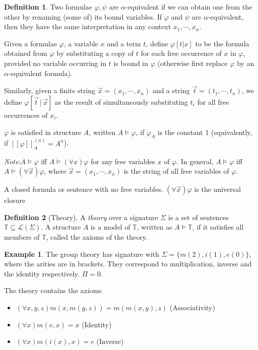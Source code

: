 \documentclass[a4paper]{article}
\theoremstyle{definition}
\newtheorem*{defi}{Definition}
\newtheorem*{eg}{Example}
\newcommand{\note}{\noindent \emph{Note}:\;}
\newcommand{\T}{\mathbb{T}}
\newcommand{\La}{\mathcal{L}}
\begin{document}
\begin{defi}
  Two formulae $\varphi, \psi$ are $\alpha$-equivalent if we can obtain one from the other by renaming (some of) its bound variables. If $\varphi$ and $\psi$ are $\alpha$-equivalent, then they have the same interpretation in any context $x_1, \cdots, x_n$.

  Given a formulae $\varphi$, a variable $x$ and a term $t$, define $\varphi[t|x]$ to be the formula obtained from $\varphi$ by substituting a copy of $t$ for each free occurrence of $x$ in $\varphi$, provided no variable occurring in $t$ is bound in $\varphi$ (otherwise first replace $\varphi$ by an $\alpha$-equivalent formula).

Similarly, given a finite string $\vec x = (x_1, \cdots, x_n)$ and a string $\vec t = (t_1, \cdots, t_n)$, we define $\varphi[\vec t\,|\,\vec x]$ as the result of simultaneously substituting $t_i$ for all free occurrences of $x_i$.

$\varphi$ is satisfied in structure $A$, written $A\models \varphi$, if $\varphi_A$ is the constant 1 (equivalently, if $[\![\varphi]\!]_A^{(n)} = A^n$).
\end{defi}

\note $A\models \varphi$ iff $A\models (\forall x)\varphi$ for any free variables $x$ of $\varphi$. In general, $A\models \varphi$ iff $A\models(\forall \vec x)\varphi$, where $\vec x = (x_1, \cdots, x_n)$ is the string of all free variables of $\varphi$.

A closed formula or sentence with no free variables. $(\forall\vec x)\varphi$ is the universal closure

\begin{defi}[Theory]
  A \emph{theory} over a signature $\Sigma$ is a set of sentences $\T\subseteq \La(\Sigma)$. A structure $A$ is a model of $\T$, written as $A\models \T$, if it satisfies all members of $\T$, called the axioms of the theory.
\end{defi}

\begin{eg}
  The group theory has signature with $\Sigma = \{m(2), i(1), e(0)\}$, where the arities are in brackets. They correspond to multiplication, inverse and the identity respectively. $\Pi = 0$.

  The theory contains the axioms
  \begin{itemize}
  \item $(\forall x, y, z)m(x,m(y,z)) = m(m(x,y),z)$ (Associativity)
  \item $(\forall x)m(e, x) = x$ (Identity)
  \item $(\forall x)m(i(x),x) = e$ (Inverse)
  \end{itemize}
\end{eg}
\end{document}
